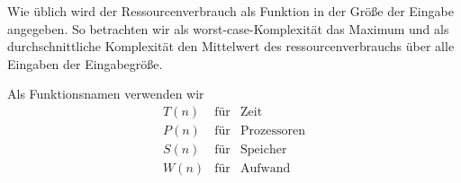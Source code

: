 \noindent Wie üblich wird der Ressourcenverbrauch als Funktion in der Größe der Eingabe angegeben. So betrachten wir als worst-case-Komplexität das Maximum und als durchschnittliche Komplexität den Mittelwert des ressourcenverbrauchs über alle Eingaben der Eingabegröße.

\noindent Als Funktionsnamen verwenden wir
\begin{eqnarray*}
T(n) & \text{für} & \text{Zeit} \\
P(n) & \text{für} & \text{Prozessoren} \\
S(n) & \text{für} & \text{Speicher} \\
W(n) & \text{für} & \text{Aufwand} 
\end{eqnarray*}

